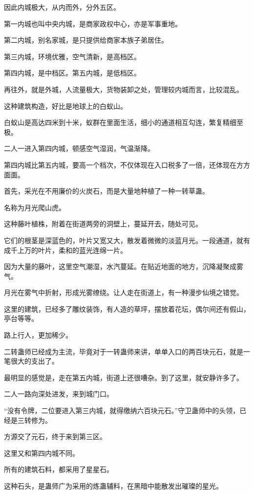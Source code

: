 \begin{this_body}
因此内城极大，从内而外，分外五区。

第一内城也叫中央内城，是商家政权中心，亦是军事重地。

第二内城，别名家城，是只提供给商家本族子弟居住。

第三内城，环境优雅，空气清新，是高档区。

第四内城，是中档区。第五内城，是低档区。

再往外，就是外城，人流量极大，货物装卸之处，管理较内城而言，比较混乱。

这种建筑构造，好比是地球上的白蚁山。

白蚁山是高达四米到十米，蚁群在里面生活，细小的通道相互勾连，繁复精细至极。

二人一进入第四内城，顿感空气湿润，气温渐降。

第四内城比第五内城，要高一个档次，不仅体现在入口税多了一倍，还体现在方方面面。

首先，采光在不用廉价的火炭石，而是大量地种植了一种一转草蛊。

名称为月光爬山虎。

这种藤叶植株，附着在街道两旁的洞壁上，蔓延开去，随处可见。

它们的根茎是深蓝色的，叶片又宽又大，散发着微微的淡蓝月光。一段通道，就有成千上万的叶片，柔和的蓝光连绵一片。

因为大量的藤叶，这里空气潮湿，水汽蔓延。在贴近地面的地方，沉降凝聚成雾气。

月光在雾气中折射，形成光雾缭绕。让人走在街道上，有一种漫步仙境之错觉。

这里的建筑，已经多了雕纹装饰，有人造的草坪，摆放着花坛，偶尔间还有假山，亭台等等。

路上行人，更加稀少。

二转蛊师已经成为主流，毕竟对于一转蛊师来讲，单单入口的两百块元石，就是一笔很大的支出了。

最明显的感觉是，走在第五内城，街道上还很嘈杂。到了这里，就安静许多了。

二人一路向深处进发，来到城门口。

“没有令牌，二位要进入第三内城，就得缴纳六百块元石。”守卫蛊师中的头领，已经是三转修为。

方源交了元石，终于来到第三区。

这里又和第四内城不同。

所有的建筑石料，都采用了星星石。

这种石头，是蛊师广为采用的炼蛊辅料，在黑暗中能散发出璀璨的星光。


\end{this_body}
